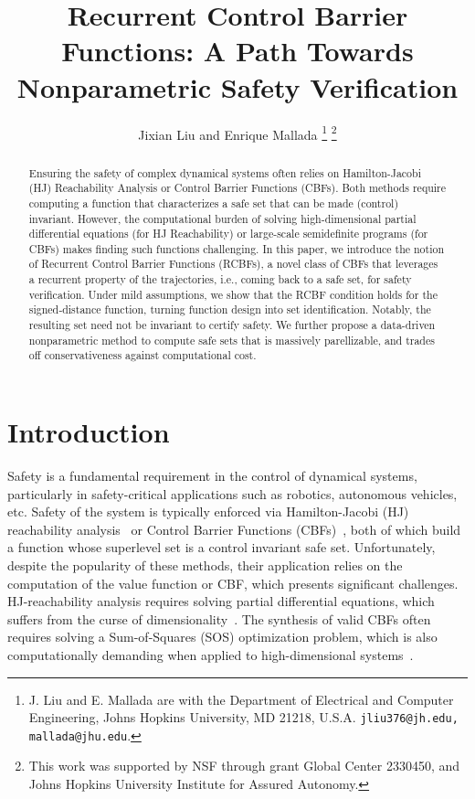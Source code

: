 \documentclass[letterpaper, 10 pt, conference]{ieeeconf}
\title{\LARGE \bf 
Recurrent Control Barrier Functions: A Path Towards Nonparametric Safety Verification
}
\author{Jixian Liu and Enrique Mallada
\thanks{J. Liu and E. Mallada are with the Department of Electrical and Computer Engineering, Johns Hopkins University, MD 21218, U.S.A. 
        {\tt\small jliu376@jh.edu, mallada@jhu.edu}.}
\thanks{This work was supported by NSF through grant Global Center 2330450, and Johns Hopkins University Institute for Assured Autonomy.
}}
\begin{document}
\maketitle
\thispagestyle{empty}
\pagestyle{empty}

\begin{abstract}
Ensuring the safety of complex dynamical systems often relies on Hamilton-Jacobi (HJ) Reachability Analysis or Control Barrier Functions (CBFs). Both methods require computing a function that characterizes a safe set that can be made (control) invariant. However, the computational burden of solving high-dimensional partial differential equations (for HJ Reachability) or large-scale semidefinite programs (for CBFs) makes finding such functions challenging. In this paper, we introduce the notion of Recurrent Control Barrier Functions (RCBFs), a novel class of CBFs that leverages a recurrent property of the trajectories, i.e., coming back to a safe set, for safety verification. Under mild assumptions, we show that the RCBF condition holds for the signed‑distance function, turning function design into set identification. Notably, the resulting set need not be invariant to certify safety. 
We further propose a data-driven nonparametric method to compute safe sets that is massively parellizable, and trades off conservativeness against computational cost. 
\end{abstract}
\section{Introduction}
Safety is a fundamental requirement in the control of dynamical systems, particularly in safety-critical applications such as robotics, autonomous vehicles, etc. Safety of the system is typically enforced via Hamilton-Jacobi (HJ) reachability analysis~\cite{mbt2005tac} or Control Barrier Functions (CBFs)~\cite{acenst2019ecc}, both of which build a function whose superlevel set is a control invariant safe set. Unfortunately, despite the popularity of these methods, their application relies on the computation of the value function or CBF, which presents significant challenges. HJ-reachability analysis requires solving partial differential equations, which suffers from the curse of dimensionality~\cite{bcht2017cdc}. The synthesis of valid CBFs often requires solving a Sum-of-Squares (SOS) optimization problem, which is also computationally demanding when applied to high-dimensional systems~\cite{dp2023acc, c2021cdc}. 
\end{document}

